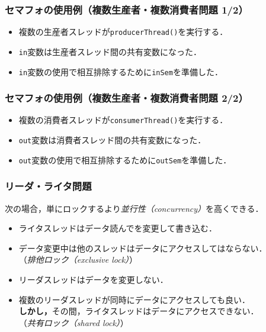 \documentclass[unicode,handout]{beamer}                   %
\begin{document}
\begin{frame}
  \frametitle{セマフォの使用例（複数生産者・複数消費者問題 1/2）}
  \begin{itemize}
  \item 複数の生産者スレッドが\texttt{producerThread()}を実行する．
  \item \texttt{in}変数は生産者スレッド間の共有変数になった．
  \item \texttt{in}変数の使用で相互排除するために\texttt{inSem}を準備した．
  \end{itemize}
  \vfill
\end{frame}

\begin{frame}
  \frametitle{セマフォの使用例（複数生産者・複数消費者問題 2/2）}
  \begin{itemize}
  \item 複数の消費者スレッドが\texttt{consumerThread()}を実行する．
  \item \texttt{out}変数は消費者スレッド間の共有変数になった．
  \item \texttt{out}変数の使用で相互排除するために\texttt{outSem}を準備した．
  \end{itemize}
  \vfill
\end{frame}

\begin{frame}
  \frametitle{リーダ・ライタ問題}
  次の場合，単にロックするより\emph{並行性（concurrency）}を高くできる．
  \vfill
  \begin{itemize}
  \item ライタスレッドはデータ読んでを変更して書き込む．
  \item データ変更中は他のスレッドはデータにアクセスしてはならない．\\
    （\emph{排他ロック（exclusive lock）}）
      \vfill
  \item リーダスレッドはデータを変更しない．
  \item 複数のリーダスレッドが同時にデータにアクセスしても良い．\\
    \textbf{しかし，}その間，ライタスレッドはデータにアクセスできない．\\
    （\emph{共有ロック（shared lock）}）
  \end{itemize}
  \vfill
\end{frame}
\end{document}
